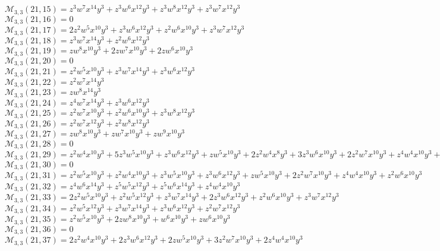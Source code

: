 $\mathcal{M}_{3,3}(21,15)=z^3w^7x^{14}y^3+z^3w^6x^{12}y^3+z^3w^8x^{12}y^3+z^3w^7x^{12}y^3$\\
$\mathcal{M}_{3,3}(21,16)=0$\\
$\mathcal{M}_{3,3}(21,17)=2z^2w^5x^{10}y^3+z^3w^6x^{12}y^3+z^2w^6x^{10}y^3+z^3w^7x^{12}y^3$\\
$\mathcal{M}_{3,3}(21,18)=z^3w^7x^{14}y^3+z^2w^6x^{12}y^3$\\
$\mathcal{M}_{3,3}(21,19)=zw^8x^{10}y^3+2zw^7x^{10}y^3+2zw^6x^{10}y^3$\\
$\mathcal{M}_{3,3}(21,20)=0$\\
$\mathcal{M}_{3,3}(21,21)=z^2w^5x^{10}y^3+z^3w^7x^{14}y^3+z^3w^6x^{12}y^3$\\
$\mathcal{M}_{3,3}(21,22)=z^2w^7x^{14}y^3$\\
$\mathcal{M}_{3,3}(21,23)=zw^8x^{14}y^3$\\
$\mathcal{M}_{3,3}(21,24)=z^4w^7x^{14}y^3+z^3w^6x^{12}y^3$\\
$\mathcal{M}_{3,3}(21,25)=z^2w^7x^{10}y^3+z^2w^6x^{10}y^3+z^3w^8x^{12}y^3$\\
$\mathcal{M}_{3,3}(21,26)=z^2w^7x^{12}y^3+z^2w^8x^{12}y^3$\\
$\mathcal{M}_{3,3}(21,27)=zw^8x^{10}y^3+zw^7x^{10}y^3+zw^9x^{10}y^3$\\
$\mathcal{M}_{3,3}(21,28)=0$\\
$\mathcal{M}_{3,3}(21,29)=z^2w^4x^{10}y^3+5z^3w^5x^{10}y^3+z^3w^6x^{12}y^3+zw^5x^{10}y^3+2z^2w^4x^8y^3+3z^3w^6x^{10}y^3+2z^2w^7x^{10}y^3+z^4w^4x^{10}y^3+z^2w^5x^8y^3$\\
$\mathcal{M}_{3,3}(21,30)=0$\\
$\mathcal{M}_{3,3}(21,31)=z^2w^5x^{10}y^3+z^2w^4x^{10}y^3+z^3w^5x^{10}y^3+z^3w^6x^{12}y^3+zw^5x^{10}y^3+2z^2w^7x^{10}y^3+z^4w^4x^{10}y^3+z^2w^6x^{10}y^3$\\
$\mathcal{M}_{3,3}(21,32)=z^4w^6x^{14}y^3+z^5w^5x^{12}y^3+z^5w^6x^{14}y^3+z^4w^4x^{10}y^3$\\
$\mathcal{M}_{3,3}(21,33)=2z^2w^5x^{10}y^3+z^2w^5x^{12}y^3+z^3w^7x^{14}y^3+2z^3w^6x^{12}y^3+z^2w^6x^{10}y^3+z^3w^7x^{12}y^3$\\
$\mathcal{M}_{3,3}(21,34)=z^2w^5x^{12}y^3+z^3w^7x^{14}y^3+z^3w^6x^{12}y^3+z^2w^7x^{12}y^3$\\
$\mathcal{M}_{3,3}(21,35)=z^2w^5x^{10}y^3+2zw^8x^{10}y^3+w^6x^{10}y^3+zw^6x^{10}y^3$\\
$\mathcal{M}_{3,3}(21,36)=0$\\
$\mathcal{M}_{3,3}(21,37)=2z^2w^4x^{10}y^3+2z^3w^6x^{12}y^3+2zw^5x^{10}y^3+3z^2w^7x^{10}y^3+2z^4w^4x^{10}y^3$\\

